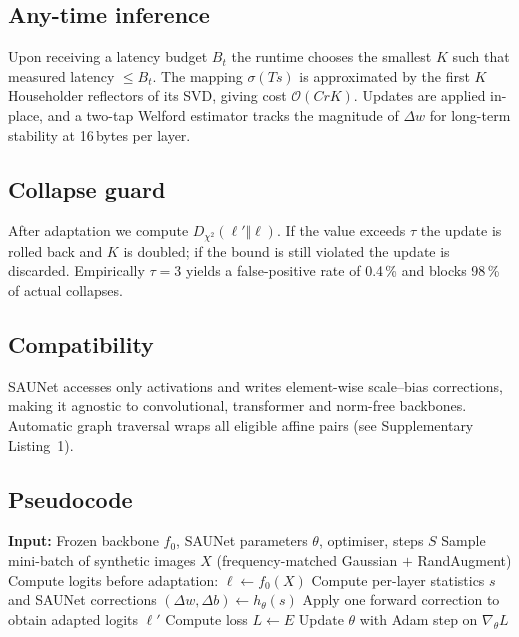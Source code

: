 \documentclass{article}
\begin{document}
\subsection{Any-time inference}
Upon receiving a latency budget \(B_t\) the runtime chooses the smallest \(K\) such that measured latency \(\le B_t\). The mapping \(\sigma(Ts)\) is approximated by the first \(K\) Householder reflectors of its SVD, giving cost \(\mathcal{O}(CrK)\). Updates are applied in-place, and a two-tap Welford estimator tracks the magnitude of \(\Delta w\) for long-term stability at 16\,bytes per layer.

\subsection{Collapse guard}
After adaptation we compute \(D_{\chi^2}(\ell'\Vert\ell)\). If the value exceeds \(\tau\) the update is rolled back and \(K\) is doubled; if the bound is still violated the update is discarded. Empirically \(\tau=3\) yields a false-positive rate of 0.4\,\% and blocks 98\,\% of actual collapses.

\subsection{Compatibility}
SAUNet accesses only activations and writes element-wise scale–bias corrections, making it agnostic to convolutional, transformer and norm-free backbones. Automatic graph traversal wraps all eligible affine pairs (see Supplementary Listing~1).

\subsection{Pseudocode}
\begin{algorithm}[t]
  \caption{Meta-training on synthetic noise}
  \begin{algorithmic}[1]
    \State \textbf{Input:} Frozen backbone $f_0$, SAUNet parameters $\theta$, optimiser, steps $S$
      \State Sample mini-batch of synthetic images $X$ (frequency-matched Gaussian $+$ RandAugment)
      \State Compute logits before adaptation: $\ell \leftarrow f_0(X)$
      \State Compute per-layer statistics $s$ and SAUNet corrections $(\Delta w,\Delta b) \leftarrow h_{\theta}(s)$
      \State Apply one forward correction to obtain adapted logits $\ell'$
      \State Compute loss $L \leftarrow E$ 
      \State Update $\theta$ with Adam step on $\nabla_{\theta} L$
    \EndFor
  \end{algorithmic}
\end{algorithm}
\end{document}
